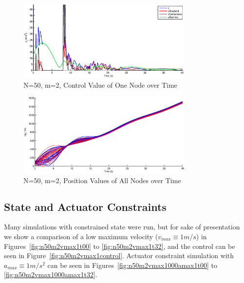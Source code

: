 \documentclass[10pt, conference]{IEEEtran}
\begin{document}
\begin{figure}[!p]
  \begin{center}
    \includegraphics[width=3.45in]{n50m2control}
  \end{center}

  \caption{\small N=50, m=2, Control Value of One Node over Time}
  \label{fig:n50m2control}
\end{figure}

\begin{figure}[!p]
  \begin{center}
    \includegraphics[width=3.45in]{n50m2position}
  \end{center}

  \caption{\small N=50, m=2, Position Values of All Nodes over Time}
  \label{fig:n50m2position}
\end{figure}

\clearpage

\subsection{State and Actuator Constraints}

Many simulations with constrained state were run, but for sake of presentation we show a comparison of a low maximum velocity ($v_{max} \equiv 1m/s$) in Figures~\ref{fig:n50m2vmax1t00} to \ref{fig:n50m2vmax1t32}, and the control can be seen in Figure~\ref{fig:n50m2vmax1control}.
%
Actuator constraint simulation with $a_{max} \equiv 1m/s^2$ can be seen in Figures~\ref{fig:n50m2vmax1000amax1t00} to \ref{fig:n50m2vmax1000amax1t32}.
\end{document}
